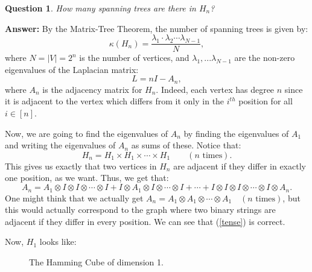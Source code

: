\documentclass[11pt]{article}
\newtheorem{question}[theorem]{Question}
\newenvironment{answer}{\noindent \textbf{Answer:}}{}
\begin{document}
\begin{question}
	How many spanning trees are there in $H_n$?
\end{question}

\begin{answer}
	By the Matrix-Tree Theorem, the number of spanning trees is given by:
	\begin{equation} \label{eval} \kappa(H_n) = \frac{\lambda_1 \cdot \lambda_2 \dotsb \lambda_{N-1}}{N}, \end{equation}
	where $N=|V|=2^n$ is the number of vertices, and $\lambda_1, ... \lambda_{N-1}$
	are the non-zero eigenvalues of the Laplacian matrix:
	$$L=nI-A_n,$$
	where $A_n$ is the adjacency matrix for $H_n$. Indeed, each vertex has degree $n$
	since it is adjacent to the vertex which differs from it only in the $i^{th}$ position
	for all $i \in [n]$. 
	
	Now, we are going to find the eigenvalues of $A_n$ by finding the eigenvalues of $A_1$ and
	writing the eigenvalues of $A_n$ as sums of these. Notice that:
	$$H_n = H_1 \times H_1 \times \dotsb \times H_1 \qquad (n \text{ times}).$$
	This gives us exactly that two vertices in $H_n$ are adjacent if they differ in exactly
	one position, as we want. Thus, we get that:
	\begin{equation} \label{tense} A_n = A_1 \otimes I \otimes I \otimes \dotsb \otimes I + I \otimes A_1 \otimes I \otimes \dotsb \otimes I + \dotsm + I \otimes I \otimes I \otimes \dotsb \otimes I \otimes A_n. \end{equation}
	One might think that we actually get $A_n = A_1 \otimes A_1 \otimes \dotsb \otimes A_1 \quad (n \text{ times})$, but
	this would actually correspond to the graph where two binary strings are adjacent if they
	differ in every position. We can see that (\ref{tense}) is correct.
	
	Now, $H_1$ looks like:
	
	\begin{figure}[ht]
    \begin{center}
    \end{center}
    \caption{The Hamming Cube of dimension 1.}
	\end{figure}
	

\end{answer}
\end{document}
